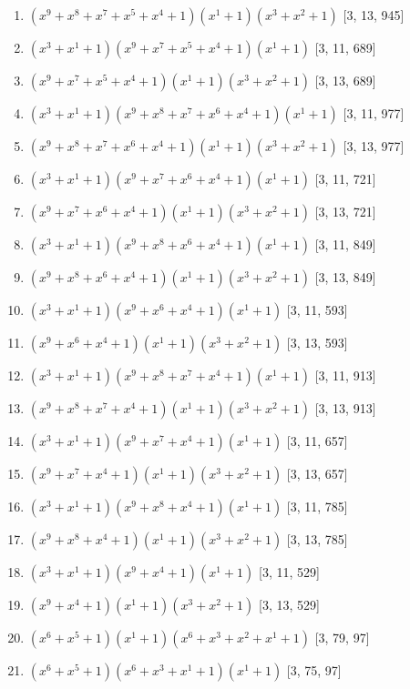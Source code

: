\documentclass[10pt,twocolumn]{article}
\begin{document}
\begin{enumerate}
\item $(x^{9} + x^{8} + x^{7} + x^{5} + x^{4} + 1)(x^{1} + 1)(x^{3} + x^{2} + 1)$  [3, 13, 945]
\item $(x^{3} + x^{1} + 1)(x^{9} + x^{7} + x^{5} + x^{4} + 1)(x^{1} + 1)$  [3, 11, 689]
\item $(x^{9} + x^{7} + x^{5} + x^{4} + 1)(x^{1} + 1)(x^{3} + x^{2} + 1)$  [3, 13, 689]
\item $(x^{3} + x^{1} + 1)(x^{9} + x^{8} + x^{7} + x^{6} + x^{4} + 1)(x^{1} + 1)$  [3, 11, 977]
\item $(x^{9} + x^{8} + x^{7} + x^{6} + x^{4} + 1)(x^{1} + 1)(x^{3} + x^{2} + 1)$  [3, 13, 977]
\item $(x^{3} + x^{1} + 1)(x^{9} + x^{7} + x^{6} + x^{4} + 1)(x^{1} + 1)$  [3, 11, 721]
\item $(x^{9} + x^{7} + x^{6} + x^{4} + 1)(x^{1} + 1)(x^{3} + x^{2} + 1)$  [3, 13, 721]
\item $(x^{3} + x^{1} + 1)(x^{9} + x^{8} + x^{6} + x^{4} + 1)(x^{1} + 1)$  [3, 11, 849]
\item $(x^{9} + x^{8} + x^{6} + x^{4} + 1)(x^{1} + 1)(x^{3} + x^{2} + 1)$  [3, 13, 849]
\item $(x^{3} + x^{1} + 1)(x^{9} + x^{6} + x^{4} + 1)(x^{1} + 1)$  [3, 11, 593]
\item $(x^{9} + x^{6} + x^{4} + 1)(x^{1} + 1)(x^{3} + x^{2} + 1)$  [3, 13, 593]
\item $(x^{3} + x^{1} + 1)(x^{9} + x^{8} + x^{7} + x^{4} + 1)(x^{1} + 1)$  [3, 11, 913]
\item $(x^{9} + x^{8} + x^{7} + x^{4} + 1)(x^{1} + 1)(x^{3} + x^{2} + 1)$  [3, 13, 913]
\item $(x^{3} + x^{1} + 1)(x^{9} + x^{7} + x^{4} + 1)(x^{1} + 1)$  [3, 11, 657]
\item $(x^{9} + x^{7} + x^{4} + 1)(x^{1} + 1)(x^{3} + x^{2} + 1)$  [3, 13, 657]
\item $(x^{3} + x^{1} + 1)(x^{9} + x^{8} + x^{4} + 1)(x^{1} + 1)$  [3, 11, 785]
\item $(x^{9} + x^{8} + x^{4} + 1)(x^{1} + 1)(x^{3} + x^{2} + 1)$  [3, 13, 785]
\item $(x^{3} + x^{1} + 1)(x^{9} + x^{4} + 1)(x^{1} + 1)$  [3, 11, 529]
\item $(x^{9} + x^{4} + 1)(x^{1} + 1)(x^{3} + x^{2} + 1)$  [3, 13, 529]
\item $(x^{6} + x^{5} + 1)(x^{1} + 1)(x^{6} + x^{3} + x^{2} + x^{1} + 1)$  [3, 79, 97]
\item $(x^{6} + x^{5} + 1)(x^{6} + x^{3} + x^{1} + 1)(x^{1} + 1)$  [3, 75, 97]

\end{enumerate}
\end{document}
